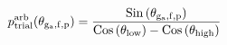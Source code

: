 \documentclass[12pt]{article}
\begin{document}
\begin{displaymath}
p_{\rm trial}^{\rm arb}(\theta_{\rm g_a,f,p}) =
{
{{\rm Sin}\left(\theta_{\rm g_a,f,p}\right)}
\over
{{\rm Cos}\left(\theta_{\rm low}\right) - {\rm Cos}\left(\theta_{\rm high}\right)
}
}
\end{displaymath}
\end{document}
